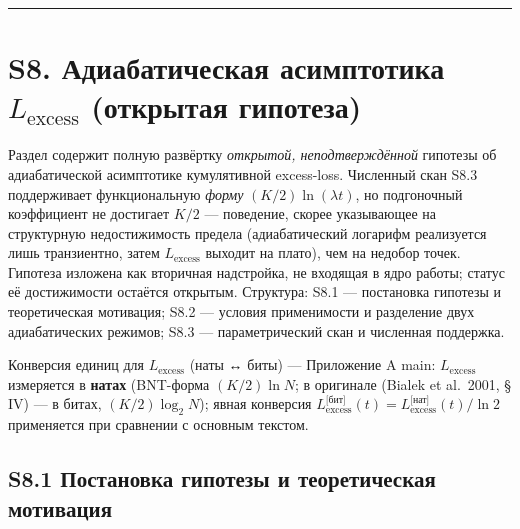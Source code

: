 \documentclass[pdflatex,sn-mathphys-ay]{sn-jnl}
\begin{document}
\begin{center}\rule{0.5\linewidth}{0.5pt}\end{center}



\section*{\texorpdfstring{S8. Адиабатическая асимптотика \(L_{\text{excess}}\) (открытая гипотеза)}{S8. Адиабатическая асимптотика L\_\{\textbackslash text\{excess\}\} (открытая гипотеза)}}\label{s8.-ux430ux434ux438ux430ux431ux430ux442ux438ux447ux435ux441ux43aux430ux44f-ux430ux441ux438ux43cux43fux442ux43eux442ux438ux43aux430-l_textexcess-ux43eux442ux43aux440ux44bux442ux430ux44f-ux433ux438ux43fux43eux442ux435ux437ux430}



Раздел содержит полную развёртку \emph{открытой, неподтверждённой} гипотезы об адиабатической асимптотике кумулятивной excess-loss. Численный скан S8.3 поддерживает функциональную \emph{форму} \((K/2)\ln(\lambda t)\), но подгоночный коэффициент не достигает \(K/2\) --- поведение, скорее указывающее на структурную недостижимость предела (адиабатический логарифм реализуется лишь транзиентно, затем \(L_{\text{excess}}\) выходит на плато), чем на недобор точек. Гипотеза изложена как вторичная надстройка, не входящая в ядро работы; статус её достижимости остаётся открытым. Структура: S8.1 --- постановка гипотезы и теоретическая мотивация; S8.2 --- условия применимости и разделение двух адиабатических режимов; S8.3 --- параметрический скан и численная поддержка.



Конверсия единиц для \(L_{\text{excess}}\) (наты ↔ биты) --- Приложение A main: \(L_{\text{excess}}\) измеряется в \textbf{натах} (BNT-форма \((K/2)\ln N\); в оригинале (Bialek et al.~2001, § IV) --- в битах, \((K/2)\log_2 N\)); явная конверсия \(L_{\text{excess}}^{\text{[бит]}}(t) = L_{\text{excess}}^{\text{[нат]}}(t)/\ln 2\) применяется при сравнении с основным текстом.



\subsection*{S8.1 Постановка гипотезы и теоретическая мотивация}\label{s8.1-ux43fux43eux441ux442ux430ux43dux43eux432ux43aux430-ux433ux438ux43fux43eux442ux435ux437ux44b-ux438-ux442ux435ux43eux440ux435ux442ux438ux447ux435ux441ux43aux430ux44f-ux43cux43eux442ux438ux432ux430ux446ux438ux44f}
\end{document}
